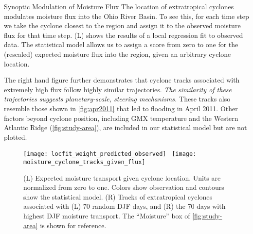 \begin{block}{Synoptic Modulation of Moisture Flux}
    The location of extratropical cyclones modulates moisture flux into the Ohio River Basin.
    To see this, for each time step we take the cyclone closest to the region and assign it to the observed moisture flux for that time step.
     (L) shows the results of a local regression \cite{Loader1999} fit to observed data.
    The statistical model allows us to assign a score from zero to one for the (rescaled) expected moisture flux into the region, given an arbitrary cyclone location.

    The right hand figure further demonstrates that cyclone tracks associated with extremely high flux follow highly similar trajectories.
    \emph{The similarity of these trajectories suggests planetary-scale, steering mechanisms.}
    These tracks also resemble those shown in \cref{fig:apr2011} that led to flooding in April 2011.
    Other factors beyond cyclone position, including GMX temperature and the Western Atlantic Ridge (\cref{fig:study-area}), are included in our statistical model but are not plotted.
    \begin{figure}
        \texttt{[image: locfit\_weight\_predicted\_observed]}~
        \texttt{[image: moisture\_cyclone\_tracks\_given\_flux]}
        \caption{(L) Expected moisture transport given cyclone location. Units are normalized from zero to one. Colors show observation and contours show the statistical model.
                (R) Tracks of extratropical cyclones associated with (L) 70 random DJF days, and (R) the 70 days with highest DJF moisture transport. The ``Moisture'' box of \cref{fig:study-area} is shown for reference.}
        \label{fig:track-given-flux}
    \end{figure}
\end{block}
